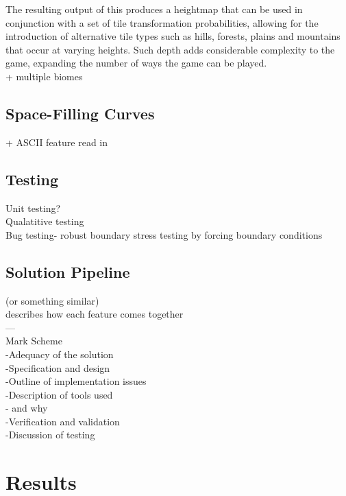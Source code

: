 \documentclass[12pt,a4paper]{article}
\begin{document}
The resulting output of this produces a heightmap that can be used in conjunction with a set of tile transformation probabilities, allowing for the introduction of alternative tile types such as hills, forests, plains and mountains that occur at varying heights. Such depth adds considerable complexity to the game, expanding the number of ways the game can be played.\\ 

+ multiple biomes\\

\subsection{Space-Filling Curves}
+ ASCII feature read in \\

\subsection{Testing}

Unit testing?\\

Qualatitive testing \\

Bug testing- robust boundary stress testing by forcing boundary conditions \\


\subsection{Solution Pipeline}
(or something similar)\\
describes how each feature comes together \\

---\\
Mark Scheme \\
-Adequacy of the solution\\
-Specification and design\\
-Outline of implementation issues\\
-Description of tools used\\
	- and why\\
-Verification and validation\\
-Discussion of testing\\


\section{Results}
\end{document}
